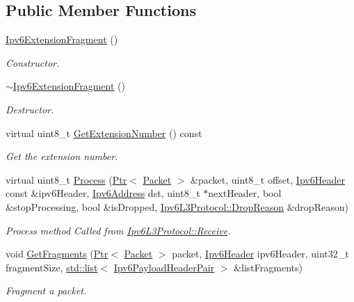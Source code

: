 \subsection*{Public Member Functions}
\begin{DoxyCompactItemize}
\item 
\hyperlink{classns3_1_1Ipv6ExtensionFragment_a392174ac90cc0fce619bcccba929f05b}{Ipv6\+Extension\+Fragment} ()
\begin{DoxyCompactList}\small\item\em Constructor. \end{DoxyCompactList}\item 
\hyperlink{classns3_1_1Ipv6ExtensionFragment_a829d639659535cbfd2003db6d69b007a}{$\sim$\+Ipv6\+Extension\+Fragment} ()
\begin{DoxyCompactList}\small\item\em Destructor. \end{DoxyCompactList}\item 
virtual uint8\+\_\+t \hyperlink{classns3_1_1Ipv6ExtensionFragment_a8192d49683cb5d89db8cf74a8a72f85a}{Get\+Extension\+Number} () const 
\begin{DoxyCompactList}\small\item\em Get the extension number. \end{DoxyCompactList}\item 
virtual uint8\+\_\+t \hyperlink{classns3_1_1Ipv6ExtensionFragment_a8563953a172a744473bf7f80cf1ef536}{Process} (\hyperlink{classns3_1_1Ptr}{Ptr}$<$ \hyperlink{classns3_1_1Packet}{Packet} $>$ \&packet, uint8\+\_\+t offset, \hyperlink{classns3_1_1Ipv6Header}{Ipv6\+Header} const \&ipv6\+Header, \hyperlink{classns3_1_1Ipv6Address}{Ipv6\+Address} dst, uint8\+\_\+t $\ast$next\+Header, bool \&stop\+Processing, bool \&is\+Dropped, \hyperlink{classns3_1_1Ipv6L3Protocol_a33c64db9bc35f71ff368b132bfffa37a}{Ipv6\+L3\+Protocol\+::\+Drop\+Reason} \&drop\+Reason)
\begin{DoxyCompactList}\small\item\em Process method Called from \hyperlink{classns3_1_1Ipv6L3Protocol_a8a95d576e8aee9a571db93bf686d850a}{Ipv6\+L3\+Protocol\+::\+Receive}. \end{DoxyCompactList}\item 
void \hyperlink{classns3_1_1Ipv6ExtensionFragment_a60bc0fdd5a5d1bcb2223c98909eef44e}{Get\+Fragments} (\hyperlink{classns3_1_1Ptr}{Ptr}$<$ \hyperlink{classns3_1_1Packet}{Packet} $>$ packet, \hyperlink{classns3_1_1Ipv6Header}{Ipv6\+Header} ipv6\+Header, uint32\+\_\+t fragment\+Size, \hyperlink{openflow-interface_8h_afd9bcfa176617760671b67580f536fa7}{std\+::list}$<$ \hyperlink{classns3_1_1Ipv6ExtensionFragment_a52bf3800a9db6fe2eb1a1c2b3a4414d8}{Ipv6\+Payload\+Header\+Pair} $>$ \&list\+Fragments)
\begin{DoxyCompactList}\small\item\em Fragment a packet. \end{DoxyCompactList}\end{DoxyCompactItemize}
